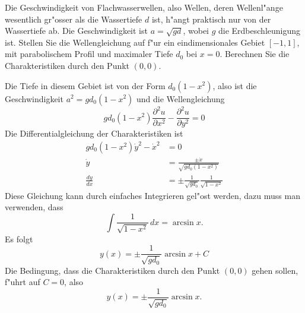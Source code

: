 Die Geschwindigkeit von Flachwasserwellen, also Wellen, deren Wellenl"ange
wesentlich gr"osser als die Wassertiefe $d$ ist, h"angt praktisch
nur von der Wassertiefe ab.  Die Geschwindigkeit ist $a=\sqrt{gd}$, wobei
$g$ die Erdbeschleunigung ist. Stellen Sie die Wellengleichung auf
f"ur ein eindimensionales Gebiet $[-1,1]$, mit parabolischem Profil
und maximaler Tiefe $d_0$ bei $x=0$. Berechnen Sie die Charakteristiken
durch den Punkt $(0,0)$.

\begin{loesung}
Die Tiefe in diesem Gebiet ist von der Form $d_0(1-x^2)$, also ist
die Geschwindigkeit $a^2=gd_0(1-x^2)$ und die Wellengleichung
\[
gd_0(1-x^2)\frac{\partial^2 u}{\partial x^2}-\frac{\partial^2u}{\partial y^2}=0
\]
Die Differentialgleichung der Charakteristiken ist
\begin{align*}
gd_0(1-x^2)\dot y^2-\dot x^2&=0
\\
\dot y&=
\frac{\pm\dot x}{\sqrt{gd_0(1-x^2)}}
\\
\frac{dy}{dx}
&=
\pm\frac1{\sqrt{gd_0}}\frac1{\sqrt{1-x^2}}
\end{align*}
Diese Gleichung kann durch einfaches Integrieren gel"ost werden,
dazu muss man verwenden, dass
\[
\int \frac1{\sqrt{1-x^2}}\,dx = \arcsin x.
\]
Es folgt
\[
y(x)
=
\pm\frac1{\sqrt{gd_0}}\arcsin x + C
\]
Die Bedingung, dass die Charakteristiken durch den Punkt $(0,0)$
gehen sollen, f"uhrt auf $C=0$, also
\[
y(x)=\pm\frac1{\sqrt{gd_0}}\arcsin x.
\]
\end{loesung}
